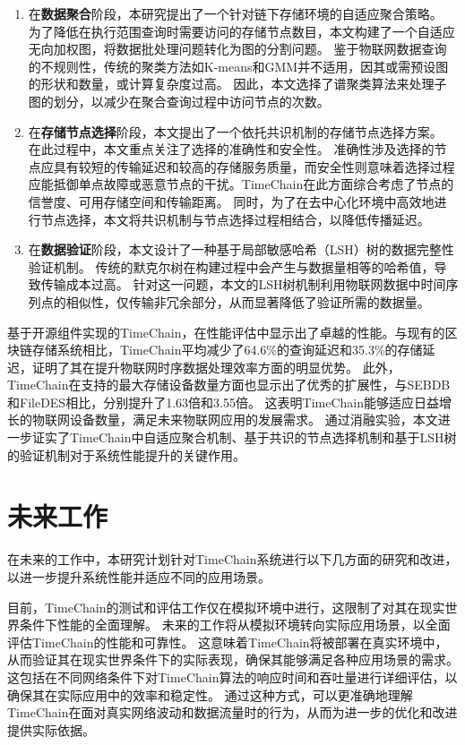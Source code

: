 \begin{enumerate}
    \item 在\textbf{数据聚合}阶段，本研究提出了一个针对链下存储环境的自适应聚合策略。
    为了降低在执行范围查询时需要访问的存储节点数目，本文构建了一个自适应无向加权图，将数据批处理问题转化为图的分割问题。
    鉴于物联网数据查询的不规则性，传统的聚类方法如K-means和GMM并不适用，因其或需预设图的形状和数量，或计算复杂度过高。
    因此，本文选择了谱聚类算法来处理子图的划分，以减少在聚合查询过程中访问节点的次数。
    \item 在\textbf{存储节点选择}阶段，本文提出了一个依托共识机制的存储节点选择方案。
    在此过程中，本文重点关注了选择的准确性和安全性。
    准确性涉及选择的节点应具有较短的传输延迟和较高的存储服务质量，而安全性则意味着选择过程应能抵御单点故障或恶意节点的干扰。TimeChain在此方面综合考虑了节点的信誉度、可用存储空间和传输距离。
    同时，为了在去中心化环境中高效地进行节点选择，本文将共识机制与节点选择过程相结合，以降低传播延迟。
    \item 在\textbf{数据验证}阶段，本文设计了一种基于局部敏感哈希（LSH）树的数据完整性验证机制。
    传统的默克尔树在构建过程中会产生与数据量相等的哈希值，导致传输成本过高。
    针对这一问题，本文的LSH树机制利用物联网数据中时间序列点的相似性，仅传输非冗余部分，从而显著降低了验证所需的数据量。
\end{enumerate}

基于开源组件实现的TimeChain，在性能评估中显示出了卓越的性能。与现有的区块链存储系统相比，TimeChain平均减少了64.6\%的查询延迟和35.3\%的存储延迟，证明了其在提升物联网时序数据处理效率方面的明显优势。
此外，TimeChain在支持的最大存储设备数量方面也显示出了优秀的扩展性，与SEBDB和FileDES相比，分别提升了1.63倍和3.55倍。
这表明TimeChain能够适应日益增长的物联网设备数量，满足未来物联网应用的发展需求。
通过消融实验，本文进一步证实了TimeChain中自适应聚合机制、基于共识的节点选择机制和基于LSH树的验证机制对于系统性能提升的关键作用。

\section{未来工作}
在未来的工作中，本研究计划针对TimeChain系统进行以下几方面的研究和改进，以进一步提升系统性能并适应不同的应用场景。

目前，TimeChain的测试和评估工作仅在模拟环境中进行，这限制了对其在现实世界条件下性能的全面理解。
未来的工作将从模拟环境转向实际应用场景，以全面评估TimeChain的性能和可靠性。
这意味着TimeChain将被部署在真实环境中，从而验证其在现实世界条件下的实际表现，确保其能够满足各种应用场景的需求。
这包括在不同网络条件下对TimeChain算法的响应时间和吞吐量进行详细评估，以确保其在实际应用中的效率和稳定性。
通过这种方式，可以更准确地理解TimeChain在面对真实网络波动和数据流量时的行为，从而为进一步的优化和改进提供实际依据。

